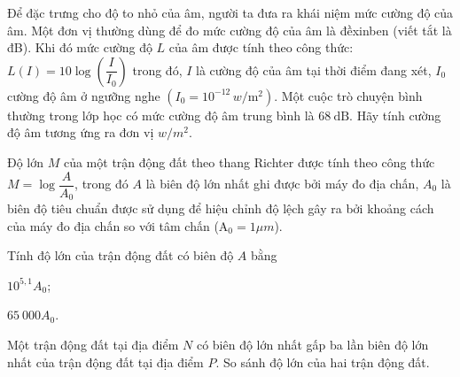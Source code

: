 \begin{vd}
	Để đặc trưng cho độ to nhỏ của âm, người ta đưa ra khái niệm mức cường độ của âm. Một đơn vị thường dùng để đo mức cường độ của âm là đềxinben (viết tắt là đB). Khi đó mức cường độ $L$ của âm được tính theo công thức: $L(I)=10 \log \left( \dfrac{I}{I_0}\right) $ trong đó, $I$ là cường độ của âm tại thời điểm đang xét, $I_0$ cường độ âm ở ngưỡng nghe $\left(I_0=10^{-12}\, w / \mathrm{m}^2\right)$. Một cuộc trò chuyện bình thường trong lớp học có mức cường độ âm trung bình là $68 \mathrm{~dB}$. Hãy tính cường độ âm tương ứng ra đơn vị $w / m^2$.
\end{vd} 

\begin{vd}%
	Độ lớn $ M $ của một trận động đất theo thang Richter được tính theo công thức $ M=\log \dfrac{A}{A_0} $, trong đó $ A $ là biên độ lớn nhất ghi được bởi máy đo địa chấn, $ A_0 $ là biên độ tiêu chuẩn được sử dụng để hiệu chỉnh độ lệch gây ra bởi khoảng cách của máy đo địa chấn so với tâm chấn ($ \mathrm{A}_0=1 \mu m$).
	\begin{listEX}[1]
		\item[a)] Tính độ lớn của trận động đất có biên độ $A$ bằng
		\begin{listEX}[2]
			\item[i)] $ 10^{5{,}1}A_0 $;
			\item[ii)] $ 65~000 A_0$.  
		\end{listEX}
		\item[b)] Một trận động đất tại địa điểm $ N $ có biên độ lớn nhất gấp ba lần biên độ lớn nhất của trận động đất tại địa điểm $ P $. So sánh độ lớn của hai trận động đất.
	\end{listEX}
\end{vd} 

